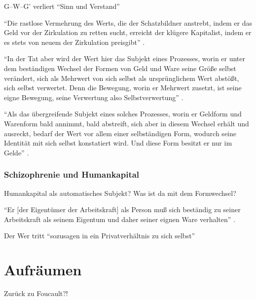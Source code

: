 \documentclass[12pt,
               DIV13,
               paper=a4,
               twoside=false,
               onehalfspacing,
               bibliography=totoc,
               toc=graduated,
               draft,
               ]{scrartcl}
\newcommand{\pc}[2]{\parencite[#1]{#2}}
\newcommand{\gwg}{G--W--G'\xspace}
\begin{document}
\gwg verliert "`Sinn und Verstand"' \pc{166}{kap}

"`Die rastlose Vermehrung des Werts, die der Schatzbildner anstrebt,
indem er das Geld vor der Zirkulation zu retten sucht, erreicht der
klügere Kapitalist, indem er es stets von neuem der Zirkulation
preisgibt"' \pc{168}{kap}.

"`In der Tat aber wird der Wert hier das Subjekt eines Prozesses,
worin er unter dem beständigen Wechsel der Formen von Geld und Ware
seine Größe selbst verändert, sich als Mehrwert von sich selbst als
ursprünglichem Wert abstößt, sich selbst verwertet. Denn die Bewegung,
worin er Mehrwert zusetzt, ist seine eigne Bewegung, seine Verwertung
also Selbstverwertung"' \pc{169}{kap}.

"`Als das übergreifende Subjekt eines solches Prozesses, worin er
Geldform und Warenform bald annimmt, bald abstreift, sich aber in
diesem Wechsel erhält und ausreckt, bedarf der Wert vor allem einer
selbständigen Form, wodurch seine Identität mit sich selbst
konstatiert wird. Und diese Form besitzt er nur im Gelde"'
\pc{169}{kap}.

\subsubsection{Schizophrenie und Humankapital}

Humankapital als automatisches Subjekt? Was ist da mit dem
Formwechsel?

"`Er [der Eigentümer der Arbeitskraft] als Person muß sich beständig
zu seiner Arbeitskraft als seinem Eigentum und daher seiner eignen
Ware verhalten"' \pc{182}{kap}.

Der Wer tritt "`sozusagen in ein Privatverhältnis zu sich selbst"'
\pc{169}{kap}


\section{Aufräumen}

Zurück zu Foucault?!


\newpage
\nocite{*}
\printshorthands
\printbibliography
\end{document}
